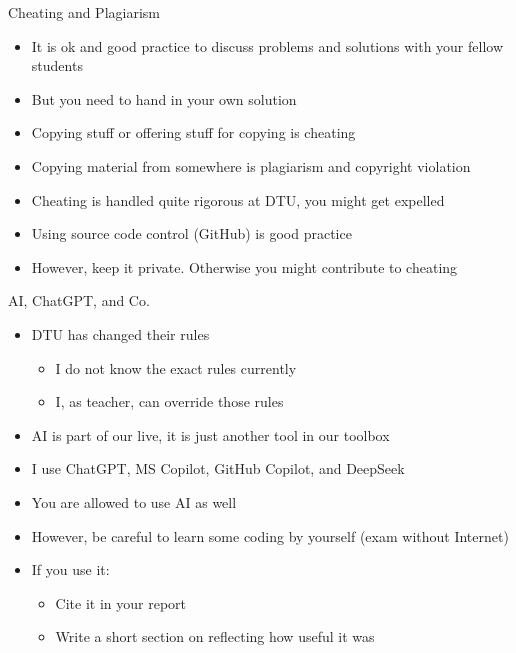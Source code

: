 
\begin{frame}[fragile]{Cheating and Plagiarism}
\begin{itemize}
\item It is ok and good practice to discuss problems and solutions with your fellow students
\item But you need to hand in your own solution
\item Copying stuff or offering stuff for copying is cheating
\item Copying material from somewhere is plagiarism and copyright violation
\item Cheating is handled quite rigorous at DTU, you might get expelled
\item Using source code control (GitHub) is good practice
\item However, keep it private. Otherwise you might contribute to cheating
\end{itemize}
\end{frame}

\begin{frame}[fragile]{AI, ChatGPT, and Co.}
\begin{itemize}
\item DTU has changed their rules
\begin{itemize}
\item I do not know the exact rules currently
\item I, as teacher, can override those rules
\end{itemize}
\item AI is part of our live, it is just another tool in our toolbox
\item I use ChatGPT, MS Copilot, GitHub Copilot, and DeepSeek
\item You are allowed to use AI as well
\item However, be careful to learn some coding by yourself (exam without Internet)
\item If you use it:
\begin{itemize}
\item Cite it in your report
\item Write a short section on reflecting how useful it was
\end{itemize}
\end{itemize}
\end{frame}

